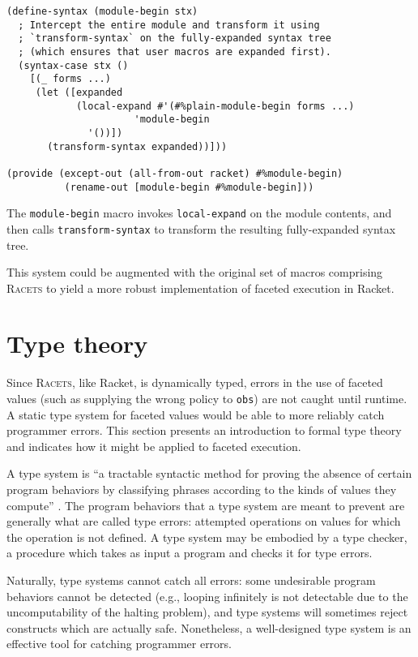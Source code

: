 \documentclass{article}
\begin{document}
\begin{lstlisting}
(define-syntax (module-begin stx)
  ; Intercept the entire module and transform it using
  ; `transform-syntax` on the fully-expanded syntax tree
  ; (which ensures that user macros are expanded first).
  (syntax-case stx ()
    [(_ forms ...)
     (let ([expanded
            (local-expand #'(#%plain-module-begin forms ...)
	                  'module-begin
			  '())])
       (transform-syntax expanded))]))

(provide (except-out (all-from-out racket) #%module-begin)
          (rename-out [module-begin #%module-begin]))
\end{lstlisting}

The \texttt{module-begin} macro invokes \texttt{local-expand} on the module contents, and then calls \texttt{transform-syntax} to transform the resulting fully-expanded syntax tree.

This system could be augmented with the original set of macros comprising \textsc{Racets} to yield a more robust implementation of faceted execution in Racket.



\section{Type theory\label{sec:types}}
Since \textsc{Racets}, like Racket, is dynamically typed, errors in the use of faceted values (such as supplying the wrong policy to \texttt{obs}) are not caught until runtime. A static type system for faceted values would be able to more reliably catch programmer errors. This section presents an introduction to formal type theory and indicates how it might be applied to faceted execution.

A type system is ``a tractable syntactic method for proving the absence of certain program behaviors by classifying phrases according to the kinds of values they compute'' \cite{types}. The program behaviors that a type system are meant to prevent are generally what are called type errors: attempted operations on values for which the operation is not defined. A type system may be embodied by a type checker, a procedure which takes as input a program and checks it for type errors.

Naturally, type systems cannot catch all errors: some undesirable program behaviors cannot be detected (e.g., looping infinitely is not detectable due to the uncomputability of the halting problem), and type systems will sometimes reject constructs which are actually safe. Nonetheless, a well-designed type system is an effective tool for catching programmer errors.
\end{document}
